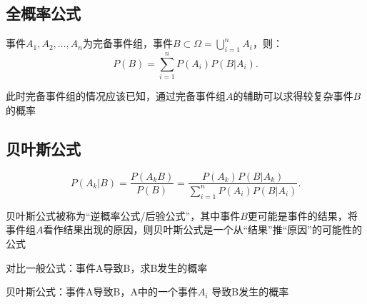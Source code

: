 \subsection{全概率公式}%
\label{sub:全概率公式}
\begin{cor}
    事件$A_1,A_2,\ldots,A_n$为完备事件组，事件$B\subset \Omega=\bigcup_{i=1}^{n}A_i$，则：\[
        P\left( B \right) =\sum_{i=1}^{n} P\left( A_i \right) P\left( B|A_i \right) 
    .\] 
\end{cor}
\begin{notation}
    此时完备事件组的情况应该已知，通过完备事件组$A$的辅助可以求得较复杂事件$B$的概率
\end{notation}


\subsection{贝叶斯公式}%
\label{sub:贝叶斯公式}
\begin{cor}
    \[
        P\left( A_{k}|B \right) =\frac{P\left( A_{k}B \right) }{P\left( B \right) }=\frac{P\left( A_{k} \right) P\left( B|A_k \right) }{\sum_{i=1}^{n} P\left( A_i \right) P\left( B|A_i \right)}
    .\] 
\end{cor}
贝叶斯公式被称为“逆概率公式/后验公式”，其中事件$B$更可能是事件的结果，将事件组$A$看作结果出现的原因，则贝叶斯公式是一个从“结果”推“原因”的可能性的公式

\begin{notation}
    对比一般公式：事件A导致B，求B发生的概率

    贝叶斯公式：事件A导致B，A中的一个事件$A_i$ 导致B发生的概率
\end{notation}

